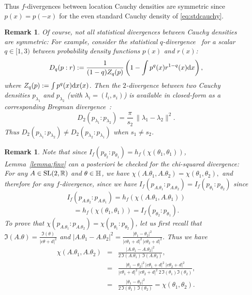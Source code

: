\documentclass[journal]{IEEEtran}
\newtheorem{remark}[theorem]{Remark}
\begin{document}
Thus $f$-divergences between location Cauchy densities are symmetric since $p(x)=p(-x)$ for the even standard Cauchy density of \eqref{eq:stdcauchy}. 


\begin{remark}
Of course, not all statistical divergences between Cauchy densities are symmetric:
For example, consider the statistical $q$-divergence~\cite{IG-2016} for a scalar $q\in [1,3)$ between probability density functions $p(x)$ and $r(x)$:
$$
D_q(p:r) :=\frac{1}{(1-q)Z_q(p)}\left(1-\int p^q(x) r^{1-q}(x) \mathrm{d}x\right),
$$
where $Z_q(p):= \int p^q(x) \mathrm{d}x(x)$.
Then the $2$-divergence between two Cauchy densities $p_{\lambda_1}$ and $p_{\lambda_2}$ (with $\lambda_i=(l_i,s_i)$) 
is available in closed-form as a corresponding Bregman divergence~\cite{IG-2016}:
$$
D_2(p_{\lambda_1}:p_{\lambda_2})=\frac{\pi}{s_2}\, \|\lambda_1-\lambda_2\|^2.
$$
Thus $D_2(p_{\lambda_1}:p_{\lambda_2})\not=D_2(p_{\lambda_2}:p_{\lambda_1})$ when $s_1\not=s_2$.
\end{remark}

\begin{remark}
Note that since $I_f(p_{\theta_2}:p_{\theta_1}) = h_f \left(\chi(\theta_1,\theta_1)\right)$, Lemma~\ref{lemma:finv} can {\it a posteriori} be checked for 
the chi-squared divergence: For any $A\in\mathrm{SL}(2, {\mathbb{R}})$ and $\theta\in\mathbb{H}$, we have
$
\chi(A.\theta_1, A.\theta_2)=\chi(\theta_1, \theta_2), 
$
and therefore for any $f$-divergence, since we have 
$I_f(p_{A.\theta_1}:p_{A.\theta_2})=I_f(p_{\theta_1}:p_{\theta_2})$ 
since 
$$
I_f(p_{A.\theta_2}:p_{A.\theta_1}) = h_f(\chi(A.\theta_1,A.\theta_1)) $$
$$= h_f(\chi(\theta_1,\theta_1)) 
=I_f(p_{\theta_2}:p_{\theta_1}).
$$
To prove that $\chi(p_{A.\theta_1}:p_{A.\theta_2})=\chi(p_{\theta_1}:p_{\theta_2})$, let us first recall that
$\Im(A.\theta)=\frac{\Im(\theta)}{|c\theta+d|^2}$
and
$|A.\theta_1-A.\theta_2|^2=\frac{|\theta_1-\theta_2|^2}{|c\theta_1+d|^2 \, |c\theta_2+d|^2}$.
Thus we have
\begin{eqnarray*}
\chi(A.\theta_1, A.\theta_2) &=& \frac{ |A.\theta_1-A.\theta_2|^2 }{ 2\,\Im(A.\theta_1)\,\Im(A.\theta_2) },\\
&=&
\frac{ |\theta_1-\theta_2|^2\, |c\theta_1+d|^2\ |c\theta_2+d|^2}{ |c\theta_1+d|^2 \ |c\theta_2+d|^2\ 2\,\Im(\theta_1)\Im(\theta_2)},\\
&=& \frac{|\theta_1-\theta_2|^2}{ 2\, \Im(\theta_1)\,\Im(\theta_2)}=\chi(\theta_1,\theta_2).
\end{eqnarray*}
\end{remark}
\end{document}
